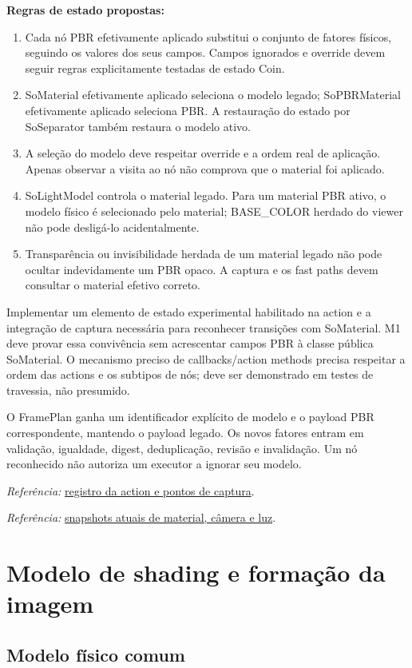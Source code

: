 \documentclass[11pt,a4paper]{article}
\newcommand{\src}[2]{\par{\small\textit{Referência:} \href{#1}{#2}.}\par}
\begin{document}
\textbf{Regras de estado propostas:}
\begin{enumerate}
\item Cada nó PBR efetivamente aplicado substitui o conjunto de fatores físicos, seguindo os valores dos seus campos. Campos ignorados e override devem seguir regras explicitamente testadas de estado Coin.
\item SoMaterial efetivamente aplicado seleciona o modelo legado; SoPBRMaterial efetivamente aplicado seleciona PBR. A restauração do estado por SoSeparator também restaura o modelo ativo.
\item A seleção do modelo deve respeitar override e a ordem real de aplicação. Apenas observar a visita ao nó não comprova que o material foi aplicado.
\item SoLightModel controla o material legado. Para um material PBR ativo, o modelo físico é selecionado pelo material; BASE\_COLOR herdado do viewer não pode desligá-lo acidentalmente.
\item Transparência ou invisibilidade herdada de um material legado não pode ocultar indevidamente um PBR opaco. A captura e os fast paths devem consultar o material efetivo correto.
\end{enumerate}

Implementar um elemento de estado experimental habilitado na action e a integração de captura necessária para reconhecer transições com SoMaterial. M1 deve provar essa convivência sem acrescentar campos PBR à classe pública SoMaterial. O mecanismo preciso de callbacks/action methods precisa respeitar a ordem das actions e os subtipos de nós; deve ser demonstrado em testes de travessia, não presumido.

O FramePlan ganha um identificador explícito de modelo e o payload PBR correspondente, mantendo o payload legado. Os novos fatores entram em validação, igualdade, digest, deduplicação, revisão e invalidação. Um nó reconhecido não autoriza um executor a ignorar seu modelo.
\src{/mnt/Laranja/Git/externos/coin-render/src/actions/CoinRenderAction.cpp}{registro da action e pontos de captura}
\src{/mnt/Laranja/Git/externos/coin-render/src/rendering/coinrender/CoinRenderFramePlan.h}{snapshots atuais de material, câmera e luz}

\section{Modelo de shading e formação da imagem}

\subsection{Modelo físico comum}
\end{document}
